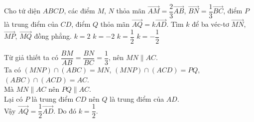 \begin{ex}%
 Cho tứ diện $ABCD$, các điểm $M$, $N$ thỏa mãn $\overrightarrow{AM}=\dfrac{2}{3}\overrightarrow{AB}$, $\overrightarrow{BN}=\dfrac{1}{3}\overrightarrow{BC}$, điểm $P$ là trung điểm của $CD$, điểm $Q$ thỏa mãn $\overrightarrow{AQ}=k\overrightarrow{AD}$. Tìm $k$ để ba véc-tơ $\overrightarrow{MN}$, $\overrightarrow{MP}$, $\overrightarrow{MQ}$ đồng phẳng.
 \choice
  {$k=2$}
  {$k=-2$}
  {\True $k=\dfrac{1}{2}$}
  {$k=-\dfrac{1}{2}$}
 \loigiai
  {
  \immini
  {
  Từ giả thiết ta có $\dfrac{BM}{AB}=\dfrac{BN}{BC}=\dfrac{1}{3}$, nên $MN\parallel AC$.\\
  Ta có $(MNP)\cap(ABC)=MN$, $(MNP)\cap(ACD)=PQ$, $(ABC)\cap(ACD)=AC$.\\
  Mà $MN\parallel AC$ nên $PQ\parallel AC$.\\
  Lại có $P$ là trung điểm $CD$ nên $Q$ là trung điểm của $AD$.\\
  Vậy $\overrightarrow{AQ}=\dfrac{1}{2}\overrightarrow{AD}$. Do đó $k=\dfrac{1}{2}$.
  }
  {
  }
  }
\end{ex}

